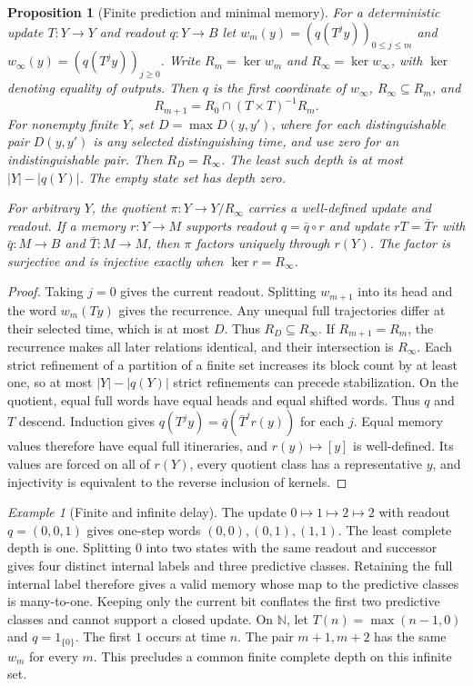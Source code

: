 \documentclass[aps,pra,onecolumn,superscriptaddress,nofootinbib,10pt]{revtex4-2}
\newtheorem{proposition}[theorem]{Proposition}
\theoremstyle{definition}
\theoremstyle{remark}
\newtheorem{example}[theorem]{Example}
\begin{document}
\begin{proposition}[Finite prediction and minimal memory]\label{ob:predictive}
For a deterministic update \(T\colon Y\to Y\) and readout \(q\colon Y\to B\)
let \(w_m(y)=(q(T^j y))_{0\le j\le m}\) and
\(w_\infty(y)=(q(T^j y))_{j\ge0}\). Write \(R_m=\ker w_m\) and
\(R_\infty=\ker w_\infty\), with \(\ker\) denoting equality of outputs.
Then \(q\) is the first coordinate of \(w_\infty\),
\(R_\infty\subseteq R_m\), and
\[
 R_{m+1}=R_0\cap(T\times T)^{-1}R_m .
\]
For nonempty finite \(Y\), set \(D=\max D(y,y')\), where for each
distinguishable pair \(D(y,y')\) is any selected distinguishing
time, and use zero for an indistinguishable pair. Then \(R_D=R_\infty\).
The least such depth is at most \(|Y|-|q(Y)|\). The empty state set
has depth zero.

For arbitrary \(Y\), the quotient \(\pi\colon Y\to Y/R_\infty\)
carries a well-defined update and readout. If a memory \(r\colon Y\to M\)
supports readout \(q=\bar q\circ r\) and update \(rT=\bar T r\) with
\(\bar q\colon M\to B\) and \(\bar T\colon M\to M\), then \(\pi\) factors
uniquely through \(r(Y)\). The factor is surjective and is injective
exactly when \(\ker r=R_\infty\).
\end{proposition}
\begin{proof}
Taking \(j=0\) gives the current readout. Splitting \(w_{m+1}\) into its
head and the word \(w_m(Ty)\) gives the recurrence. Any unequal full
trajectories differ at their selected time, which is at most \(D\).
Thus \(R_D\subseteq R_\infty\). If \(R_{m+1}=R_m\), the recurrence
makes all later relations identical, and their intersection is
\(R_\infty\). Each strict refinement of a partition of a finite
set increases its block count by at least one, so at most
\(|Y|-|q(Y)|\) strict refinements can precede stabilization.
On the quotient, equal full words have equal heads and equal shifted
words. Thus \(q\) and \(T\) descend. Induction gives
\(q(T^j y)=\bar q(\bar T^j r(y))\) for each \(j\).
Equal memory values therefore have equal full itineraries, and
\(r(y)\mapsto[y]\) is well-defined. Its values are forced on all of
\(r(Y)\), every quotient class has a representative \(y\), and
injectivity is equivalent to the reverse inclusion of kernels.
\end{proof}

\begin{example}[Finite and infinite delay]\label{ob:delays}
The update \(0\mapsto1\mapsto2\mapsto2\) with readout \(q=(0,0,1)\)
gives one-step words \((0,0),(0,1),(1,1)\). The least complete depth
is one. Splitting \(0\) into two states with the same readout and
successor gives four distinct internal labels and three predictive
classes. Retaining the full internal label therefore gives a valid
memory whose map to the predictive classes is many-to-one.
Keeping only the current bit conflates the first two predictive
classes and cannot support a closed update. On \(\mathbb N\), let
\(T(n)=\max(n-1,0)\) and \(q=1_{\{0\}}\). The first \(1\) occurs at
time \(n\). The pair \(m+1,m+2\) has the same \(w_m\) for every \(m\).
This precludes a common finite complete depth on this infinite set.
\end{example}
\end{document}
